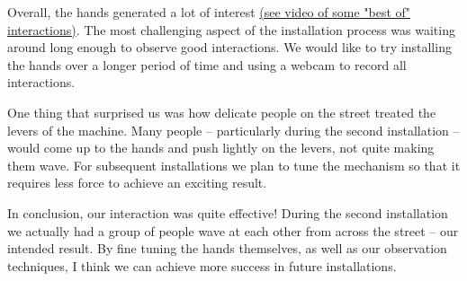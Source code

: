 \documentclass[11pt]{report}
\begin{document}
Overall, the hands generated a lot of interest \href{https://drive.google.com/file/d/1pUGkjezofgZf2cuKnzpuoyqFLIYEEZ25/view?usp=sharing}{(see video of some "best of" interactions)}. The most challenging aspect of the installation process was waiting around long enough to observe good interactions. We would like to try installing the hands over a longer period of time and using a webcam to record all interactions. 

One thing that surprised us was how delicate people on the street treated the levers of the machine. Many people -- particularly during the second installation -- would come up to the hands and push lightly on the levers, not quite making them wave. For subsequent installations we plan to tune the mechanism so that it requires less force to achieve an exciting result. 

In conclusion, our interaction was quite effective! During the second installation we actually had a group of people wave at each other from across the street -- our intended result. By fine tuning the hands themselves, as well as our observation techniques, I think we can achieve more success in future installations. 
\end{document}
